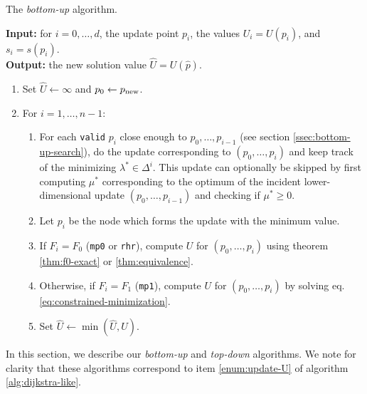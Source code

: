 \documentclass[smallcondensed]{svjour3}
\begin{document}
\begin{algorithm}[t]
  \caption{The \emph{bottom-up} algorithm.}\label{alg:bottom-up}
  \textbf{Input:} for $i = 0, \hdots, d$, the update point $p_i$, the
  values
  $U_i = U(p_i)$, and $s_i = s(p_i)$. \\
  \textbf{Output:} the new solution value $\hat{U} = U(\hat{p})$.
  \begin{enumerate}[nolistsep]
  \item Set $\hat{U} \gets \infty$ and $p_0 \gets p_{\operatorname{new}}$.
  \item For $i = 1, \hdots, n - 1$:
    \begin{enumerate}
    \item For each \texttt{valid} $p_i$ close enough to
      $p_0, \hdots, p_{i-1}$ (see section\@
      \ref{ssec:bottom-up-search}), do the update corresponding to
      $(p_0, \hdots, p_i)$ and keep track of the minimizing
      $\lambda^* \in \Delta^i$. This update can optionally be skipped
      by first computing $\mu^*$ corresponding to the optimum of the
      incident lower-dimensional update $(p_0, \hdots, p_{i-1})$ and
      checking if $\mu^* \geq 0$.\label{enum:bottom-up-for}
    \item Let $p_i$ be the node which forms the update with the
      minimum value.
    \item If $F_i = F_0$ (\texttt{mp0} or \texttt{rhr}), compute $U$
      for $(p_0, \hdots, p_{i})$ using theorem \ref{thm:f0-exact} or
      \ref{thm:equivalence}.
    \item Otherwise, if $F_i = F_1$ (\texttt{mp1}), compute $U$ for
      $(p_0, \hdots, p_{i})$ by solving eq.\@
      \ref{eq:constrained-minimization}.
    \item Set $\hat{U} \gets \min(\hat{U}, U)$.
    \end{enumerate}
  \end{enumerate}
\end{algorithm}

In this section, we describe our \emph{bottom-up} and \emph{top-down} algorithms. We
note for clarity that these algorithms correspond to item
\ref{enum:update-U} of algorithm \ref{alg:dijkstra-like}.
\end{document}
